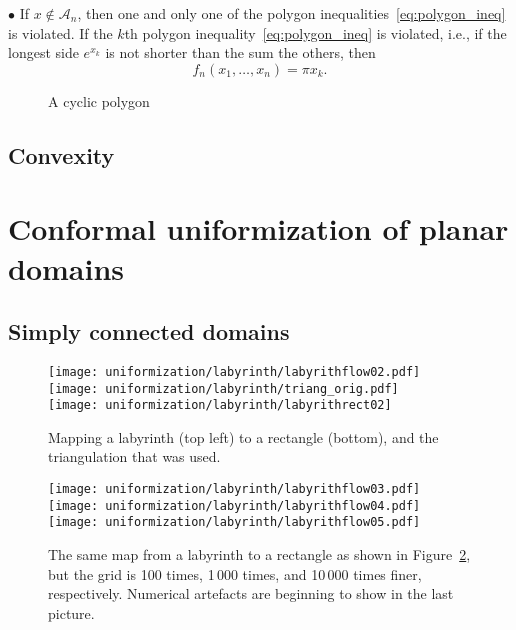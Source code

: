 \documentclass[Thesis.tex]{subfiles}
\begin{document}
  $\bullet$ If $x\not\in\mathcal{A}_{n}$, then one and
  only one of the polygon inequalities~\eqref{eq:polygon_ineq} is
  violated. If the $k$th polygon inequality~\eqref{eq:polygon_ineq} is
  violated, i.e., if the longest side $e^{x_{k}}$ is not shorter than
  the sum the others, then
  \begin{equation}
    \label{eq:f_n_violate}
    f_{n}(x_{1},\ldots,x_{n})=\pi x_{k}.
  \end{equation}


  \begin{figure}
    \centering
    
    \caption{A cyclic polygon}
    \label{fig:cyclicpolygon}
  \end{figure}


  \subsection{Convexity}
  \label{sec:convexity}

  \section{Conformal uniformization of planar domains}
  \subsection{Simply connected domains}

  \begin{figure}
    \centering
    \texttt{[image: uniformization/labyrinth/labyrithflow02.pdf]}\hfill
    \texttt{[image: uniformization/labyrinth/triang\_orig.pdf]}\\
    \smallskip
    \texttt{[image: uniformization/labyrinth/labyrithrect02]}
    \caption{Mapping a labyrinth (top left) to a rectangle (bottom), and
      the triangulation that was used.}
    \label{fig:labyrinth1}
  \end{figure}

  \begin{figure}
    \centering
    \texttt{[image: uniformization/labyrinth/labyrithflow03.pdf]}\hfill
    \texttt{[image: uniformization/labyrinth/labyrithflow04.pdf]}\hfill
    \texttt{[image: uniformization/labyrinth/labyrithflow05.pdf]}
    \caption{The same map from a labyrinth to a rectangle as shown in
      Figure~\ref{fig:labyrinth1}, but the grid is 100 times, 1\,000
      times, and 10\,000 times finer, respectively. Numerical artefacts
      are beginning to show in the last picture.}
  \end{figure}
\end{document}
